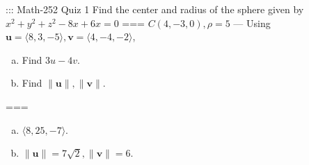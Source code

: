 ::: Math-252 Quiz 1
Find the center and radius of the sphere given by \(x^2+y^2+z^2-8x+6x=0\)
===
\(C(4,-3,0),\rho=5\)
---
Using \(\mathbf u=\langle 8,3,-5\rangle,\mathbf v=\langle 4,-4,-2\rangle\),
\begin{enumerate}[a.]
  \item Find \(3u-4v\).
  \item Find \(\|\mathbf u\|,\|\mathbf v\|\).
\end{enumerate}
===
\begin{enumerate}[a.]
  \item \(\langle 8,25,-7\rangle\).
  \item \(\|\mathbf u\|=7\sqrt 2,\|\mathbf v\|=6\).
\end{enumerate}
